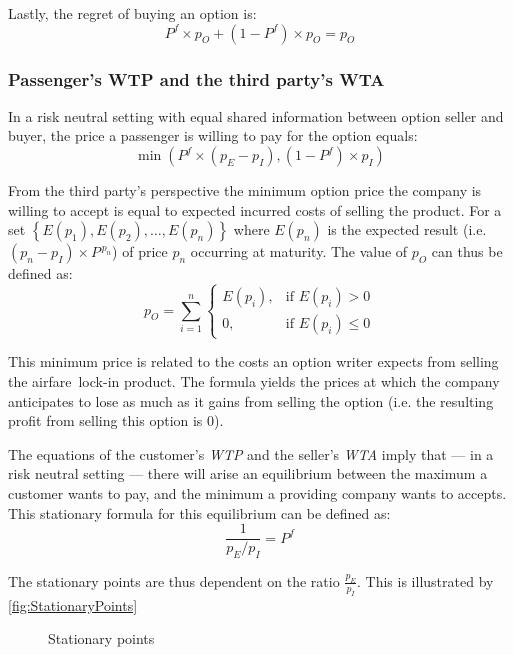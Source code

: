 Lastly, the regret of buying an option is:
\begin{equation*}
P^f \times p_O + (1 - P^f) \times p_O = p_O
\end{equation*}

\subsubsection{Passenger's WTP and the third party's WTA}
\label{subsec:PassengersWTP}
In a risk neutral setting with equal shared information between option seller and buyer, the price a passenger is willing to pay for the option equals:
\begin{equation}
\min(P^f \times (p_E - p_I), (1 - P^f) \times p_I)
\end{equation}

From the third party's perspective the minimum option price the company is willing to accept is equal to expected incurred costs of selling the product. For a set $\left\{ E(p_1), E(p_2), \ldots, E(p_n)\right\}$ where $E(p_n)$ is the expected result (i.e. $(p_n - p_I) \times P^{\,p_n}$) of price $p_n$ occurring at maturity. The value of $p_O$ can thus be defined as:
\begin{equation}
p_O = \sum\limits_{i=1}^n\begin{cases}
     E(p_i), & \mbox{if } E(p_i) > 0 \\
    0, & \mbox{if } E(p_i) \le 0 \end{cases}
\end{equation}

This minimum price is related to the costs an option writer expects from selling the airfare~lock-in product. The formula yields the prices at which the company anticipates to lose as much as it gains from selling the option (i.e. the resulting profit from selling this option is $0$).

The equations of the customer's \emph{WTP} and the seller's \emph{WTA} imply that --- in a risk neutral setting --- there will arise an equilibrium between the maximum a customer wants to pay, and the minimum a providing company wants to accepts. This stationary formula for this equilibrium can be defined as:
\begin{equation}
\frac{1}{p_E/p_I} = P^f
\end{equation}

The stationary points are thus dependent on the ratio $\frac{p_E}{p_I}$. This is illustrated by \autoref{fig:StationaryPoints}
\begin{figure*}
    \centering
    \caption{Stationary points}
    \label{fig:StationaryPoints}
\end{figure*}

